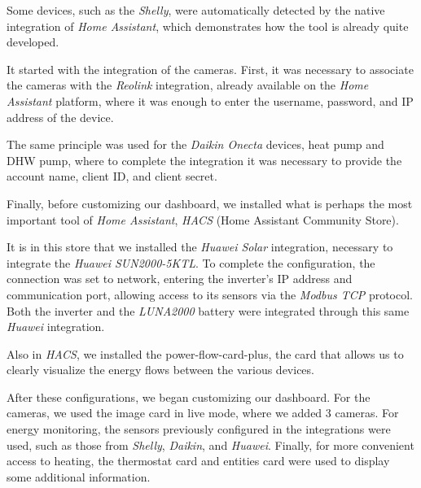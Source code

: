 \documentclass[graybox]{svmult}
\begin{document}
Some devices, such as the \textit{Shelly}, were automatically detected by the native integration of \textit{Home Assistant}, which demonstrates how the tool is already quite developed.

It started with the integration of the cameras. First, it was necessary to associate the cameras with the \textit{Reolink} integration, already available on the \textit{Home Assistant} platform, where it was enough to enter the username, password, and IP address of the device.

The same principle was used for the \textit{Daikin Onecta} devices, heat pump and DHW pump, where to complete the integration it was necessary to provide the account name, client ID, and client secret.

Finally, before customizing our dashboard, we installed what is perhaps the most important tool of \textit{Home Assistant}, \textit{HACS} (Home Assistant Community Store).

It is in this store that we installed the \textit{Huawei Solar} integration, necessary to integrate the \textit{Huawei SUN2000-5KTL}. To complete the configuration, the connection was set to network, entering the inverter’s IP address and communication port, allowing access to its sensors via the \textit{Modbus TCP} protocol. Both the inverter and the \textit{LUNA2000} battery were integrated through this same \textit{Huawei} integration.

Also in \textit{HACS}, we installed the power-flow-card-plus, the card that allows us to clearly visualize the energy flows between the various devices.

After these configurations, we began customizing our dashboard. For the cameras, we used the image card in live mode, where we added 3 cameras. For energy monitoring, the sensors previously configured in the integrations were used, such as those from \textit{Shelly}, \textit{Daikin}, and \textit{Huawei}. Finally, for more convenient access to heating, the thermostat card and entities card were used to display some additional information.\\


%
%
%
%
%
%
%
\end{document}
